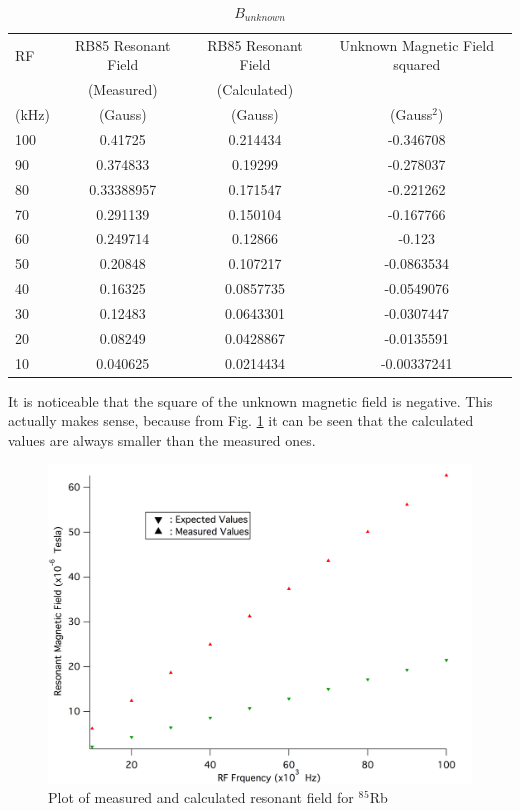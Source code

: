 \documentclass[prb,preprint]{revtex4-1}
\begin{document}
\begin{table}[h]
\centering
\caption{$B_{unknown}$}
\begin{ruledtabular}
\begin{tabular}{ l c c c}
RF & RB85 Resonant Field & RB85 Resonant Field & Unknown Magnetic Field squared\\
 & (Measured) & (Calculated) & \\
(kHz) & (Gauss) & (Gauss) & (Gauss$^{2}$)\\
\hline
100 & 0.41725 & 0.214434 & -0.346708\\
90 & 0.374833 & 0.19299 & -0.278037\\
80 & 0.33388957 & 0.171547 & -0.221262\\
70 & 0.291139 & 0.150104 & -0.167766\\
60 & 0.249714 & 0.12866 & -0.123\\
50 & 0.20848 & 0.107217 & -0.0863534\\
40 & 0.16325 & 0.0857735 & -0.0549076\\
30 & 0.12483 & 0.0643301 & -0.0307447\\
20 &	0.08249 & 0.0428867 & -0.0135591\\
10 &	0.040625 & 0.0214434 & -0.00337241\\

\end{tabular}
\end{ruledtabular}
\label{calibration}
\end{table}

It is noticeable that the square of the unknown magnetic field is negative. This actually makes sense, because from Fig. \ref{caliplot} it can be seen that the calculated values are always smaller than the measured ones.

\begin{figure}[h]
\centering
\includegraphics[width=16cm]{calibration.png}
\caption{Plot of measured and calculated resonant field for $^8$$^5$Rb}
\label{caliplot}
\end{figure}
\end{document}
